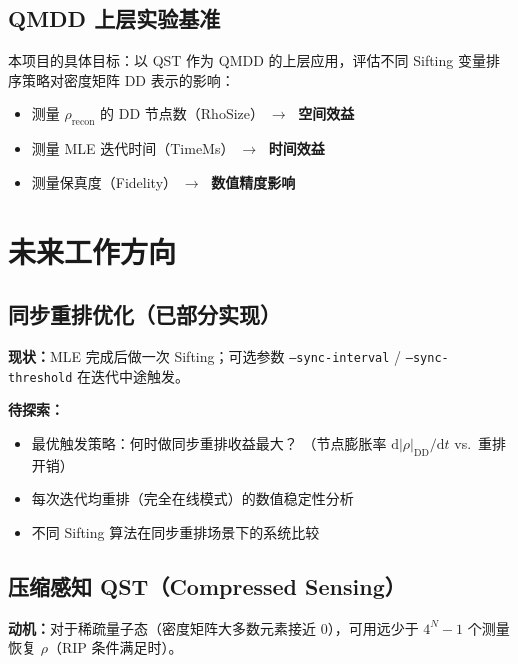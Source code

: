 \documentclass[12pt, a4paper]{article}
\begin{document}
\subsection{QMDD 上层实验基准}

本项目的具体目标：以 QST 作为 QMDD 的上层应用，评估不同 Sifting
变量排序策略对密度矩阵 DD 表示的影响：

\begin{itemize}
    \item 测量 $\rho_{\mathrm{recon}}$ 的 DD 节点数（RhoSize）$\;\to\;$
          \textbf{空间效益}
    \item 测量 MLE 迭代时间（TimeMs）$\;\to\;$
          \textbf{时间效益}
    \item 测量保真度（Fidelity）$\;\to\;$
          \textbf{数值精度影响}
\end{itemize}

\section{未来工作方向}

\subsection{同步重排优化（已部分实现）}

\textbf{现状：}MLE 完成后做一次 Sifting；可选参数 \texttt{--sync-interval} /
\texttt{--sync-threshold} 在迭代中途触发。

\textbf{待探索：}
\begin{itemize}
    \item 最优触发策略：何时做同步重排收益最大？
          （节点膨胀率 $\mathrm{d}|\rho|_{\mathrm{DD}}/\mathrm{d}t$
          vs.\ 重排开销）
    \item 每次迭代均重排（完全在线模式）的数值稳定性分析
    \item 不同 Sifting 算法在同步重排场景下的系统比较
\end{itemize}

\subsection{压缩感知 QST（Compressed Sensing）}

\textbf{动机：}对于稀疏量子态（密度矩阵大多数元素接近 0），可用远少于
$4^N - 1$ 个测量恢复 $\rho$（RIP 条件满足时）。
\end{document}
